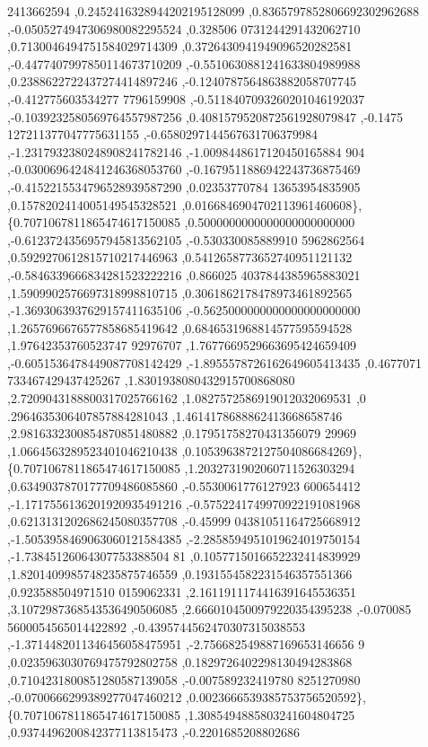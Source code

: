 \begin{DoxyCode}
      2413662594 ,0.2452416328944202195128099 ,0.8365797852806692302962688 ,-0.0505274947306980082295524 ,0.328506
      0731244291432062710 ,0.7130046494751584029714309 ,0.3726430941949096520282581 ,-0.4477407997850114673710209 
      ,-0.5510630881241633804989988 ,0.2388622722437274414897246 ,-0.1240787564863882058707745 ,-0.412775603534277
      7796159908 ,-0.5118407093260201046192037 ,-0.1039232580569764557987256 ,0.4081579520872561928079847 ,-0.1475
      127211377047775631155 ,-0.6580297144567631706379984 ,-1.2317932380248908241782146 ,-1.0098448617120450165884
      904 ,-0.0300696424841246368053760 ,-0.1679511886942243736875469 ,-0.4152215534796528939587290 ,0.02353770784
      13653954835905 ,0.1578202414005149545328521 ,0.0166846904702113961460608\},
\{0.7071067811865474617150085 ,0.5000000000000000000000000 ,-0.6123724356957945813562105 ,-0.530330085889910
      5962862564 ,0.5929270612815710217446963 ,0.5412658773652740951121132 ,-0.5846339666834281523222216 ,0.866025
      4037844385965883021 ,1.5909902576697318998810715 ,0.3061862178478973461892565 ,-1.3693063937629157411635106 
      ,-0.5625000000000000000000000 ,1.2657696676577858685419642 ,0.6846531968814577595594528 ,1.97642353760523747
      92976707 ,1.7677669529663695424659409 ,-0.6051536478449087708142429 ,-1.8955578726162649605413435 ,0.4677071
      733467429437425267 ,1.8301938080432915700868080 ,2.7209043188800317025766162 ,1.0827572586919012032069531 ,0
      .2964635306407857884281043 ,1.4614178688862413668658746 ,2.9816332300854870851480882 ,0.17951758270431356079
      29969 ,1.0664563289523401046210438 ,0.1053963872127504086684269\},
\{0.7071067811865474617150085 ,1.2032731902060711526303294 ,0.6349037870177709486085860 ,-0.5530061776127923
      600654412 ,-1.1717556136201920935491216 ,-0.5752241749970922191081968 ,0.6213131202686245080357708 ,-0.45999
      04381051164725668912 ,-1.5053958469063060121584385 ,-2.2858594951019624019750154 ,-1.73845126064307753388504
      81 ,0.1057715016652232414839929 ,1.8201409985748235875746559 ,0.1931554582231546357551366 ,0.923588504971510
      0159062331 ,2.1611911174416391645536351 ,3.1072987368543536490506085 ,2.6660104500979220354395238 ,-0.070085
      5600054565014422892 ,-0.4395744562470307315038553 ,-1.3714482011346456058475951 ,-2.756682549887169653146656
      9 ,0.0235963030769475792802758 ,0.1829726402298130494283868 ,0.7104231800851280587139058 ,-0.007589232419780
      8251270980 ,-0.0700666299389277047460212 ,0.0023666539385753756520592\},
\{0.7071067811865474617150085 ,1.3085494885803241604804725 ,0.9374496200842377113815473 ,-0.2201685208802686

\end{DoxyCode}
